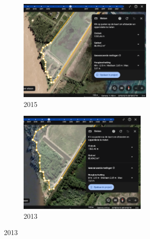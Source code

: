 \begin{figure}[H]
    \centering
    \begin{subfigure}[b]{0.48\textwidth}
        \includegraphics[width=\linewidth, height =5cm]{figures/appendix-g/opp2015.png}
        \caption{2015}
        \label{fig:second}
    \end{subfigure}
    \hfill
    \begin{subfigure}[b]{0.48\textwidth}
        \includegraphics[width=\linewidth, height =5cm]{figures/appendix-g/opp2013.png}
        \caption{2013}
        \label{fig:a}
    \end{subfigure}
    

    \vspace{0.5cm}


\end{figure}
